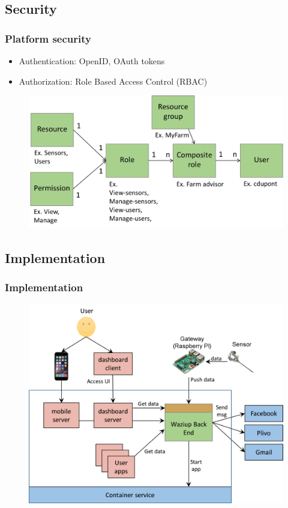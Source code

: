 \documentclass{beamer}
\begin{document}
\subsection{Security}

\begin{frame}
\frametitle{Platform security}
  
  \begin{itemize}
  \item Authentication: OpenID, OAuth tokens 
  \item Authorization: Role Based Access Control (RBAC)
  \end{itemize}

  \begin{figure}[H]
  \centering
  \includegraphics[width=.8\linewidth]{figures/RBAC.png}
  \label{fig-services}
  \end{figure}

\end{frame}

\subsection{Implementation}

\begin{frame}
\frametitle{Implementation}

  \begin{figure} 
  \centering  
  \includegraphics[width=.8\linewidth]{figures/CloudEnv.png}   
  \label{fig-implem}  
  \end{figure}

\end{frame}
\end{document}
